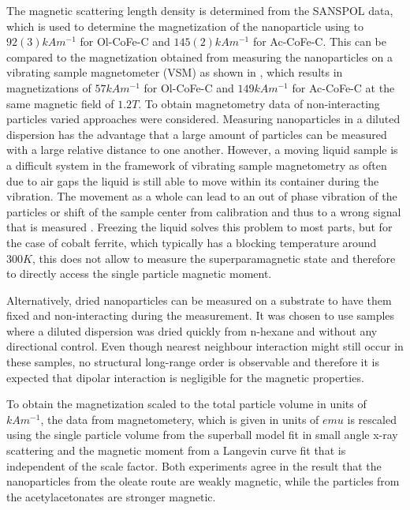 \documentclass[\main/dresen_thesis.tex]{subfiles}
\begin{document}
    The magnetic scattering length density is determined from the SANSPOL data, which is used to determine the magnetization of the nanoparticle using  to $92(3) \unit{kAm^{-1}}$ for Ol-CoFe-C and $145(2) \unit{kAm^{-1}}$ for Ac-CoFe-C.
    This can be compared to the magnetization obtained from measuring the nanoparticles on a vibrating sample magnetometer (VSM) as shown in , which results in magnetizations of $57 \unit{kAm^{-1}}$ for Ol-CoFe-C and $149 \unit{kAm^{-1}}$ for Ac-CoFe-C at the same magnetic field of $1.2 \unit{T}$.
    To obtain magnetometry data of non-interacting particles varied approaches were considered.
    Measuring nanoparticles in a diluted dispersion has the advantage that a large amount of particles can be measured with a large relative distance to one another.
    However, a moving liquid sample is a difficult system in the framework of vibrating sample magnetometry as often due to air gaps the liquid is still able to move within its container during the vibration. 
    The movement as a whole can lead to an out of phase vibration of the particles or shift of the sample center from calibration and thus to a wrong signal that is measured \cite{Boekelheide_2016_Artif}.
    Freezing the liquid solves this problem to most parts, but for the case of cobalt ferrite, which typically has a blocking temperature around $300 \unit{K}$, this does not allow to measure the superparamagnetic state and therefore to directly access the single particle magnetic moment.

    Alternatively, dried nanoparticles can be measured on a substrate to have them fixed and non-interacting during the measurement.
    It was chosen to use samples where a diluted dispersion was dried quickly from n-hexane and without any directional control.
    Even though nearest neighbour interaction might still occur in these samples, no structural long-range order is observable and therefore it is expected that dipolar interaction is negligible for the magnetic properties.

    To obtain the magnetization scaled to the total particle volume in units of $\unit{kAm^{-1}}$, the data from magnetometery, which is given in units of $\unit{emu}$ is rescaled using the single particle volume from the superball model fit in small angle x-ray scattering and the magnetic moment from a Langevin curve fit that is independent of the scale factor.
    Both experiments agree in the result that the nanoparticles from the oleate route are weakly magnetic, while the particles from the acetylacetonates are stronger magnetic.
\end{document}
